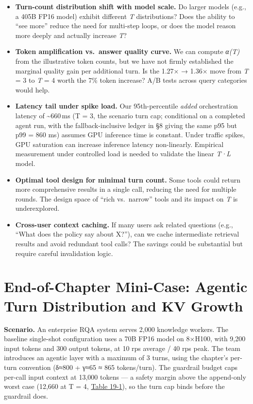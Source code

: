 \begin{itemize}
\tightlist
\item
  \textbf{Turn-count distribution shift with model scale.} Do larger
  models (e.g., a 405B FP16 model) exhibit different \emph{T}
  distributions? Does the ability to ``see more'' reduce the need for
  multi-step loops, or does the model reason more deeply and actually
  increase \emph{T}?
\item
  \textbf{Token amplification vs.~answer quality curve.} We can compute
  \emph{α(T)} from the illustrative token counts, but we have not firmly
  established the marginal quality gain per additional turn. Is the
  1.27× → 1.36× move from \emph{T} = 3 to \emph{T} = 4 worth the 7\%
  token increase? A/B tests across query categories would help.
\item
  \textbf{Latency tail under spike load.} Our 95th-percentile
  \emph{added} orchestration latency of \textasciitilde660\,ms (T = 3,
  the scenario turn cap; conditional on a completed agent run, with the
  fallback-inclusive ledger in §8 giving the same p95 but p99 = 860 ms)
  assumes GPU inference time is constant. Under traffic spikes, GPU
  saturation can increase inference latency non-linearly. Empirical
  measurement under controlled load is needed to validate the linear
  \emph{T·L} model.
\item
  \textbf{Optimal tool design for minimal turn count.} Some tools could
  return more comprehensive results in a single call, reducing the need
  for multiple rounds. The design space of ``rich vs.~narrow'' tools and
  its impact on \emph{T} is underexplored.
\item
  \textbf{Cross-user context caching.} If many users ask related
  questions (e.g., ``What does the policy say about X?''), can we cache
  intermediate retrieval results and avoid redundant tool calls? The
  savings could be substantial but require careful invalidation logic.
\end{itemize}

\section{End-of-Chapter Mini-Case: Agentic Turn Distribution and KV
Growth}\label{end-of-chapter-mini-case-agentic-turn-distribution-and-kv-growth}

\textbf{Scenario.} An enterprise RQA system serves 2,000 knowledge
workers. The baseline single-shot configuration uses a 70B FP16 model on
8×H100, with 9,200 input tokens and 300 output tokens, at 10 rps average
/ 40 rps peak. The team introduces an agentic layer with a maximum of 3
turns, using the chapter's per-turn convention (δ≈800 + γ≈65 ≈ 865
tokens/turn). The guardrail budget caps per-call input context at 13,000
tokens --- a safety margin above the append-only worst case (12,660 at T
= 4, \hyperref[tab:19.1]{Table 19-1}), so the turn cap binds before the guardrail does.

